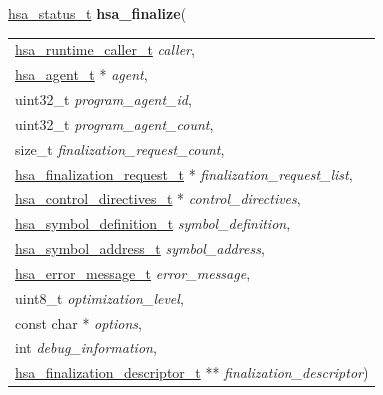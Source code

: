 \documentclass[final]{book}
\newcommand{\hsaarg}[1]{\textit{#1}}
\begin{document}
\begin{appendices}
\noindent\begin{tcolorbox}[breakable,nobeforeafter,colframe=white,colback=lightgray,left=0mm]
\hyperlink{group--status-1gad755322e7ff95456520e8abdbe90d225}{hsa_status_t} \hypertarget{group--FinalizerCoreApi-1gaa5d57be415da1b4562e9eee962439b4b}{\textbf{hsa_finalize}}(
\vspace{-3.5mm}\begin{longtable}{@{}p{\textwidth}}
\hspace{1.7em}\hyperlink{group--RuntimeCommon-1ga7d9b1191602415f5dd3893985cc93826}{hsa_runtime_caller_t} \hsaarg{caller},\\
\hspace{1.7em}\hyperlink{group--topology-1gab8db3fb886332a24acac08ec361e1d86}{hsa_agent_t} * \hsaarg{agent},\\
\hspace{1.7em}uint32_t \hsaarg{program_agent_id},\\
\hspace{1.7em}uint32_t \hsaarg{program_agent_count},\\
\hspace{1.7em}size_t \hsaarg{finalization_request_count},\\
\hspace{1.7em}\hyperlink{group--FinalizerCoreApi-1gaf933a0a1175b6a9930f45a7d62e76fdb}{hsa_finalization_request_t} * \hsaarg{finalization_request_list},\\
\hspace{1.7em}\hyperlink{group--FinalizerCoreApi-1ga40030e03c0503b0f2c704f6cf6002add}{hsa_control_directives_t} * \hsaarg{control_directives},\\
\hspace{1.7em}\hyperlink{group--FinalizerCoreApi-1ga4135321ab9fbed37f49f57dc423ec4cf}{hsa_symbol_definition_t} \hsaarg{symbol_definition},\\
\hspace{1.7em}\hyperlink{group--FinalizerCoreApi-1ga47a961031477ca43f4fee297ae0d6dc1}{hsa_symbol_address_t} \hsaarg{symbol_address},\\
\hspace{1.7em}\hyperlink{group--FinalizerCoreApi-1ga0105dcb4254850e0ec03d44fc54e11b8}{hsa_error_message_t} \hsaarg{error_message},\\
\hspace{1.7em}uint8_t \hsaarg{optimization_level},\\
\hspace{1.7em}const char * \hsaarg{options},\\
\hspace{1.7em}int \hsaarg{debug_information},\\
\hspace{1.7em}\hyperlink{group--FinalizerCoreApi-1ga1f7f93c63b221fc5f3e0e16c615f7c05}{hsa_finalization_descriptor_t} ** \hsaarg{finalization_descriptor})\end{longtable}


\end{tcolorbox}
\end{appendices}
\end{document}
